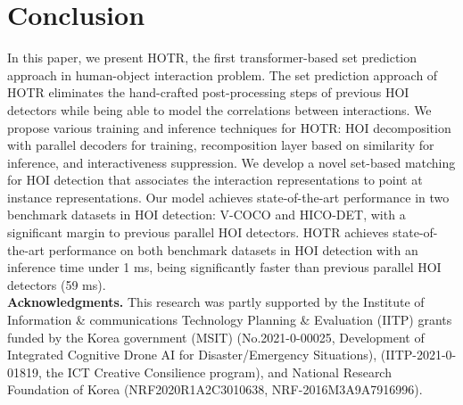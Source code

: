 \documentclass[final]{cvpr}
\begin{document}
  \section{Conclusion}
\label{sec:conclusion}
In this paper, we present HOTR, the first transformer-based set prediction approach in human-object interaction problem.
The set prediction approach of HOTR eliminates the hand-crafted post-processing steps of previous HOI detectors while being able to model the correlations between interactions.
We propose various training and inference techniques for HOTR: HOI decomposition with parallel decoders for training, recomposition layer based on similarity for inference, and interactiveness suppression.
We develop a novel set-based matching for HOI detection that associates the interaction representations to point at instance representations.
Our model achieves state-of-the-art performance in two benchmark datasets in HOI detection: V-COCO and HICO-DET, with a significant margin to previous parallel HOI detectors.
HOTR achieves state-of-the-art performance on both benchmark datasets in HOI detection with an inference time under 1 ms, being significantly faster than previous parallel HOI detectors (59 ms).
%
 \\

\noindent\textbf{Acknowledgments.}
{\small This research was partly supported by the Institute of Information \& communications Technology Planning \& Evaluation (IITP) grants funded by the Korea government (MSIT) (No.2021-0-00025, Development of Integrated Cognitive Drone AI for Disaster/Emergency Situations), (IITP-2021-0-01819, the ICT Creative Consilience program), and National Research Foundation of Korea (NRF2020R1A2C3010638, NRF-2016M3A9A7916996).}
%
 \newpage

{\small


}
\end{document}
